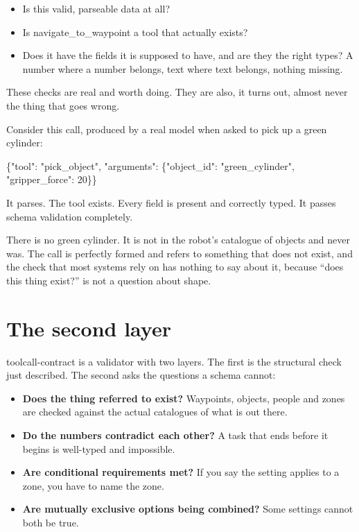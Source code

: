 \documentclass[11pt,a4paper]{article}
\newcommand{\code}[1]{{\ttfamily\small #1}}
\begin{document}
\begin{itemize}[leftmargin=1.4em,itemsep=2pt]
\item Is this valid, parseable data at all?
\item Is \code{navigate\_to\_waypoint} a tool that actually exists?
\item Does it have the fields it is supposed to have, and are they the right types? A number where a number belongs, text where text belongs, nothing missing.
\end{itemize}

These checks are real and worth doing. They are also, it turns out, almost never the thing that goes wrong.

Consider this call, produced by a real model when asked to pick up a green cylinder:

\begin{quotebox}
\code{\{"tool": "pick\_object", "arguments": \{"object\_id": "green\_cylinder",}\\
\code{\hspace*{9.4em}"gripper\_force": 20\}\}}
\end{quotebox}

It parses. The tool exists. Every field is present and correctly typed. It passes schema validation completely.

There is no green cylinder. It is not in the robot's catalogue of objects and never was. The call is perfectly formed and refers to something that does not exist, and the check that most systems rely on has nothing to say about it, because ``does this thing exist?'' is not a question about shape.

\section{The second layer}

toolcall-contract is a validator with two layers. The first is the structural check just described. The second asks the questions a schema cannot:

\begin{itemize}[leftmargin=1.4em,itemsep=2pt]
\item \textbf{Does the thing referred to exist?} Waypoints, objects, people and zones are checked against the actual catalogues of what is out there.
\item \textbf{Do the numbers contradict each other?} A task that ends before it begins is well-typed and impossible.
\item \textbf{Are conditional requirements met?} If you say the setting applies to a zone, you have to name the zone.
\item \textbf{Are mutually exclusive options being combined?} Some settings cannot both be true.
\end{itemize}
\end{document}
